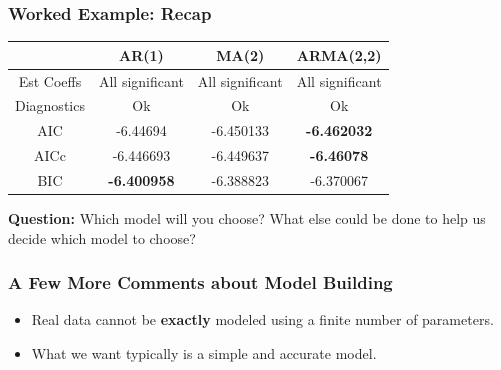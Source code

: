 \documentclass[%
xcolor=pdftex]{beamer}
\begin{document}
\begin{frame}[fragile]
\frametitle{Worked Example: Recap}

\begin{tabular}{c|c|c|c} %
      & \textbf{AR(1)} & \textbf{MA(2)} & \textbf{ARMA(2,2)}\\
			\hline
      Est Coeffs& All significant & All significant & All significant\\
      Diagnostics & Ok & Ok & Ok\\
      AIC & -6.44694 & -6.450133 & \textbf{-6.462032}\\
			AICc & -6.446693 & -6.449637 & \textbf{-6.46078}\\
			BIC & \textbf{-6.400958} & -6.388823 & -6.370067\\
    \end{tabular}
		
\textbf{Question:} Which model will you choose? What else could be done to help us decide which model to choose?

\end{frame}

\begin{frame}
\frametitle{A Few More Comments about Model Building}

\begin{itemize}
\item Real data cannot be \textbf{exactly} modeled using a finite number of parameters.
\item What we want typically is a simple and accurate model.
\end{itemize}

\end{frame}
\end{document}
